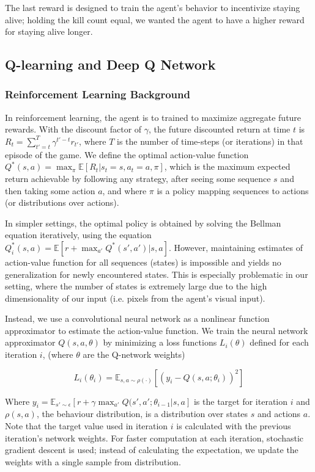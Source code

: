 \documentclass{article}
\begin{document}
\begin{multicols}{2}
The last reward is designed to train the agent's behavior to incentivize staying alive; holding the kill count equal, we wanted the agent to have a higher reward for staying alive longer.

\subsection{Q-learning and Deep Q Network}

\subsubsection{Reinforcement Learning Background}

In reinforcement learning, the agent is to trained to maximize aggregate future rewards. With the discount factor of $\gamma$, the future discounted return at time $t$ is $R_t = \sum_{t' = t}^T \gamma^{t' - t}r_{t'}$, where $T$ is the number of time-steps (or iterations) in that episode of the game.
We define the optimal action-value function
$Q^{*}(s, a) = \max_\pi \mathbb{E}[R_t | s_t = s, a_t = a, \pi]$,
which is the maximum expected return achievable by following any strategy,
after seeing some sequence $s$ and then taking some action $a$, and where $\pi$ is a policy mapping sequences to actions (or distributions over actions).

In simpler settings, the optimal policy is obtained by solving the Bellman equation iteratively, using the equation $Q_i^*(s,a) = \mathbb{E}[r +  \max_{a'} Q^* (s', a' )| s, a]$.
However, maintaining estimates of action-value function for all sequences (states) is impossible and yields no generalization for newly encountered states.
This is especially problematic in our setting, where the number of states is extremely large due to the high dimensionality of our input (i.e. pixels from the agent's visual input).

Instead, we use a convolutional neural network as a nonlinear function approximator to estimate the action-value function. We train the neural network approximator $Q(s,a,\theta)$ by minimizing a loss functions $L_i(\theta)$ defined for each iteration $i$, (where $\theta$ are the Q-network weights)

\begin{equation*}
    L_i(\theta_i) = \mathbb{E}_{s,a \sim \rho(·)} [(y_i - Q (s, a; \theta_i))^2]
\end{equation*}


Where $y_i = \mathbb{E}_{s' \sim \epsilon}[r + \gamma \max_{a'} Q(s', a'; \theta_{i-1} | s, a]$ is the target for iteration $i$ and $\rho(s, a)$, the behaviour distribution, is a distribution over states $s$ and actions $a$.
Note that the target value used in iteration $i$ is calculated with the previous iteration's network weights. For faster computation at each iteration, stochastic gradient descent is used; instead of calculating the expectation, we update the weights with a single sample from distribution.


\end{multicols}
\end{document}
